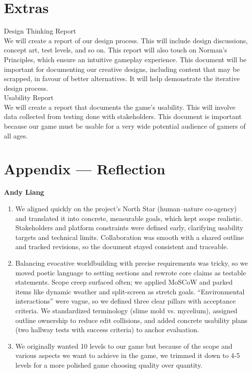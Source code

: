 \documentclass{article}
\begin{document}
\section{Extras}

Design Thinking Report\\

We will create a report of our design process. This will include design discussions, concept art, test levels, and so on. This report will also touch on Norman’s Principles, which ensure an intuitive gameplay experience. This document will be important for documenting our creative designs, including content that may be scrapped, in favour of better alternatives. It will help demonstrate the iterative design process.\\

Usability Report\\

We will create a report that documents the game’s usability. This will involve data collected from testing done with stakeholders. This document is important because our game must be usable for a very wide potential audience of gamers of all ages.\\


\newpage{}

\section*{Appendix --- Reflection}

\textbf{Andy Liang}
\begin{enumerate}
\item{We aligned quickly on the project’s North Star (human–nature co-agency) and translated it into concrete, measurable goals, which kept scope realistic. Stakeholders and platform constraints were defined early, clarifying usability targets and technical limits. Collaboration was smooth with a shared outline and tracked revisions, so the document stayed consistent and traceable.}
\item{Balancing evocative worldbuilding with precise requirements was tricky, so we moved poetic language to setting sections and rewrote core claims as testable statements. Scope creep surfaced often; we applied MoSCoW and parked items like dynamic weather and split-screen as stretch goals. “Environmental interactions” were vague, so we defined three clear pillars with acceptance criteria. We standardized terminology (slime mold vs. mycelium), assigned outline ownership to reduce edit collisions, and added concrete usability plans (two hallway tests with success criteria) to anchor evaluation.}
\item{We originally wanted 10 levels to our game but because of the scope and various aspects we want to achieve in the game, we trimmed it down to 4-5 levels for a more polished game choosing quality over quantity. }
\end{enumerate}
\end{document}
